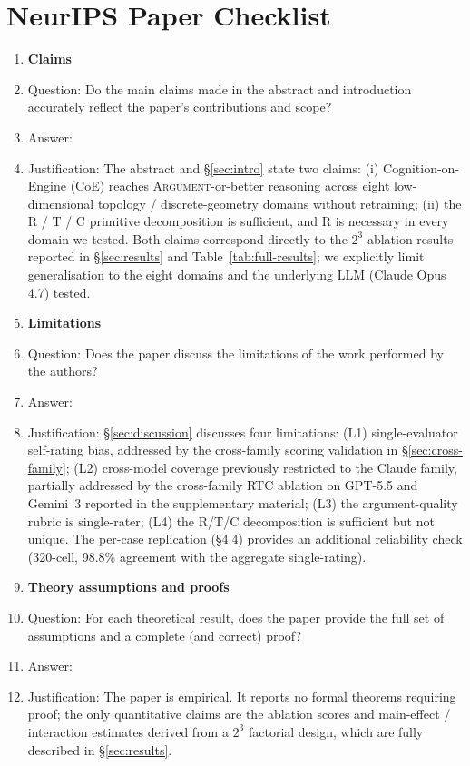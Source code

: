 \section*{NeurIPS Paper Checklist}

\begin{enumerate}

\item {\bf Claims}
    \item[] Question: Do the main claims made in the abstract and introduction accurately reflect the paper's contributions and scope?
    \item[] Answer: \answerYes{}
    \item[] Justification: The abstract and \S\ref{sec:intro} state two claims: (i) Cognition-on-Engine (CoE) reaches \textsc{Argument}-or-better reasoning across eight low-dimensional topology / discrete-geometry domains without retraining; (ii) the R / T / C primitive decomposition is sufficient, and R is necessary in every domain we tested. Both claims correspond directly to the $2^3$ ablation results reported in \S\ref{sec:results} and Table~\ref{tab:full-results}; we explicitly limit generalisation to the eight domains and the underlying LLM (Claude Opus 4.7) tested.

\item {\bf Limitations}
    \item[] Question: Does the paper discuss the limitations of the work performed by the authors?
    \item[] Answer: \answerYes{}
    \item[] Justification: \S\ref{sec:discussion} discusses four limitations: (L1) single-evaluator self-rating bias, addressed by the cross-family scoring validation in \S\ref{sec:cross-family}; (L2) cross-model coverage previously restricted to the Claude family, partially addressed by the cross-family RTC ablation on GPT-5.5 and Gemini~3 reported in the supplementary material; (L3) the argument-quality rubric is single-rater; (L4) the R/T/C decomposition is sufficient but not unique. The per-case replication (\S4.4) provides an additional reliability check (320-cell, 98.8\% agreement with the aggregate single-rating).

\item {\bf Theory assumptions and proofs}
    \item[] Question: For each theoretical result, does the paper provide the full set of assumptions and a complete (and correct) proof?
    \item[] Answer: \answerNA{}
    \item[] Justification: The paper is empirical. It reports no formal theorems requiring proof; the only quantitative claims are the ablation scores and main-effect / interaction estimates derived from a $2^3$ factorial design, which are fully described in \S\ref{sec:results}.


\end{enumerate}
